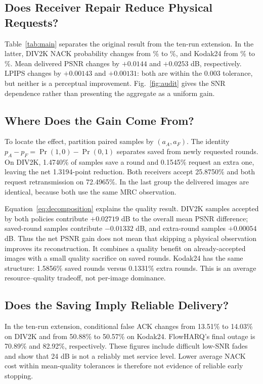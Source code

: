 \documentclass[conference]{IEEEtran}
\begin{document}
\subsection{Does Receiver Repair Reduce Physical Requests?}
Table~\ref{tab:main} separates the original result from the ten-run extension.
In the latter,
DIV2K NACK probability changes from \DivAdaptiveNack\% to \DivFlowNack\%,
and Kodak24 from \KodAdaptiveNack\% to \KodFlowNack\%. Mean delivered PSNR
changes by $+0.0144$ and $+0.0253$ dB, respectively. LPIPS changes by
$+0.00143$ and $+0.00131$: both are within the 0.003 tolerance, but neither
is a perceptual improvement. Fig.~\ref{fig:audit} gives the SNR dependence
rather than presenting the aggregate as a uniform gain.

\subsection{Where Does the Gain Come From?}
To locate the effect, partition paired samples by $(a_A,a_F)$. The identity
$p_A-p_F=\Pr(1,0)-\Pr(0,1)$ separates saved from newly requested rounds.
On DIV2K, 1.4740\% of samples save a round and 0.1545\% request an extra one,
leaving the net 1.3194-point reduction. Both receivers accept 25.8750\% and
both request retransmission on 72.4965\%. In the last group the delivered
images are identical, because both use the same MRC observation.

Equation~\eqref{eq:decomposition} explains the quality result. DIV2K samples accepted by
both policies contribute $+0.02719$ dB to the overall mean PSNR difference;
saved-round samples contribute $-0.01332$ dB, and extra-round samples
$+0.00054$ dB. Thus the net PSNR gain does not mean that skipping a physical
observation improves its reconstruction. It combines a quality benefit on
already-accepted images with a small quality sacrifice on saved rounds.
Kodak24 has the same structure: 1.5856\% saved rounds versus 0.1331\% extra
rounds. This is an average resource--quality tradeoff, not per-image dominance.

\subsection{Does the Saving Imply Reliable Delivery?}
In the ten-run extension, conditional false ACK changes from
13.51\% to 14.03\% on DIV2K and from 50.88\% to 50.57\% on Kodak24.
FlowHARQ's final outage is 70.89\% and 82.92\%, respectively. These figures
include difficult low-SNR fades and show that 24 dB is not a reliably met
service level. Lower average NACK cost within mean-quality tolerances is
therefore not evidence of reliable early stopping.
\end{document}
